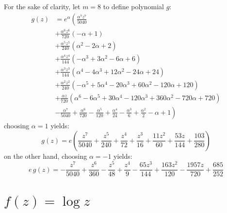 For the sake of clarity, let $m=8$ to define polynomial $g$:
\begin{displaymath}
\begin{split}
g{\left (z \right )} &= e^{\alpha}\left(\frac{\alpha^{7} z^{7}}{5040}\right. \\
&+ \frac{\alpha^{6} z^{6}}{720} \left(- \alpha + 1\right) \\
&+ \frac{\alpha^{5} z^{5}}{240} \left(\alpha^{2} - 2 \alpha + 2\right) \\
&+ \frac{\alpha^{4} z^{4}}{144} \left(- \alpha^{3} + 3 \alpha^{2} - 6 \alpha + 6\right) \\
&+ \frac{\alpha^{3} z^{3}}{144} \left(\alpha^{4} - 4 \alpha^{3} + 12 \alpha^{2} - 24 \alpha + 24\right) \\
&+ \frac{\alpha^{2} z^{2}}{240} \left(- \alpha^{5} + 5 \alpha^{4} - 20 \alpha^{3} + 60 \alpha^{2} - 120 \alpha + 120\right) \\
&+ \frac{\alpha z}{720} \left(\alpha^{6} - 6 \alpha^{5} + 30 \alpha^{4} - 120 \alpha^{3} + 360 \alpha^{2} - 720 \alpha + 720\right) \\
&- \left.\frac{\alpha^{7}}{5040} + \frac{\alpha^{6}}{720} - \frac{\alpha^{5}}{120} + \frac{\alpha^{4}}{24} - \frac{\alpha^{3}}{6} + \frac{\alpha^{2}}{2} -\alpha + 1\right) 
\end{split}
\end{displaymath}
choosing $\alpha=1$ yields:
$$ g{\left (z \right )} = e \left(\frac{z^{7}}{5040} + \frac{z^{5}}{240} + \frac{z^{4}}{72} + \frac{z^{3}}{16} + \frac{11 z^{2}}{60} + \frac{53 z}{144} + \frac{103}{280}\right) $$
on the other hand, choosing $\alpha=-1$ yields:
$$ e\,g{\left (z \right )} = - \frac{z^{7}}{5040} + \frac{z^{6}}{360} - \frac{z^{5}}{48} + \frac{z^{4}}{9} - \frac{65 z^{3}}{144} + \frac{163 z^{2}}{120} - \frac{1957 z}{720} + \frac{685}{252} $$


\section{$f(z)=\log{z}$}


